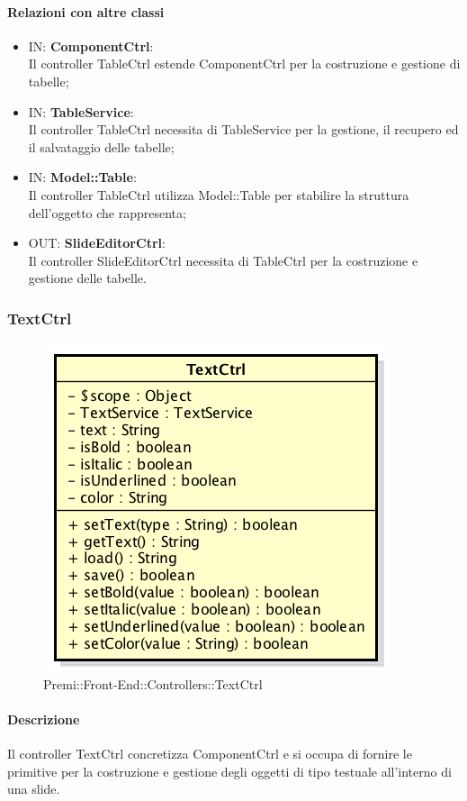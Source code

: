 \paragraph{Relazioni con altre classi}
\begin{itemize}
	\item IN: \textbf{ComponentCtrl}:\\
	Il controller TableCtrl estende ComponentCtrl per la costruzione e gestione di tabelle;
	\item IN: \textbf{TableService}:\\
	Il controller TableCtrl necessita di TableService per la gestione, il recupero ed il salvataggio delle tabelle;
	\item IN: \textbf{Model::Table}:\\
	Il controller TableCtrl utilizza Model::Table per stabilire la struttura dell'oggetto che rappresenta;
	\item OUT: \textbf{SlideEditorCtrl}:\\
	Il controller SlideEditorCtrl necessita di TableCtrl per la costruzione e gestione delle tabelle.
\end{itemize}

\newpage
\subsubsection{TextCtrl}
\begin{figure}[h]
	\centering
	\includegraphics[width=0.4\linewidth]{img/premi_front_end_controllers_textctrl}
	\caption[Premi::Front-End::Controllers::TextCtrl]{Premi::Front-End::Controllers::TextCtrl}
\end{figure}
\paragraph{Descrizione}
Il controller TextCtrl concretizza ComponentCtrl e si occupa di fornire le primitive per la costruzione e gestione degli oggetti di tipo testuale all'interno di una slide.

